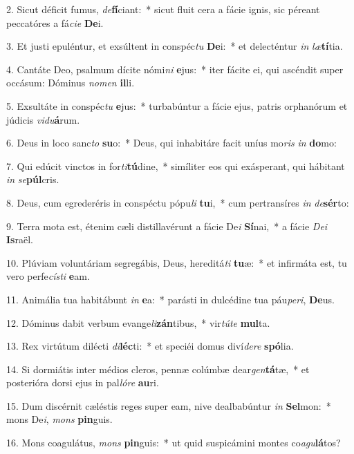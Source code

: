 2. Sicut déficit fumus, \textit{de}\textbf{fí}ciant:~*  sicut fluit cera a fácie ignis, sic péreant peccatóres a fá\textit{ci}\textit{e} \textbf{De}i.\

3. Et justi epuléntur, et exsúltent in conspéc\textit{tu} \textbf{De}i:~*  et delecténtur \textit{in} \textit{læ}\textbf{tí}tia.\

4. Cantáte Deo, psalmum dícite nómi\textit{ni} \textbf{e}jus:~*  iter fácite ei, qui ascéndit super occásum: Dóminus \textit{no}\textit{men} \textbf{il}li.\

5. Exsultáte in conspéc\textit{tu} \textbf{e}jus:~*  turbabúntur a fácie ejus, patris orphanórum et júdicis \textit{vi}\textit{du}\textbf{á}rum.\

6. Deus in loco sanc\textit{to} \textbf{su}o:~*  Deus, qui inhabitáre facit uníus mo\textit{ris} \textit{in} \textbf{do}mo:\

7. Qui edúcit vinctos in for\textit{ti}\textbf{tú}dine,~*  simíliter eos qui exásperant, qui hábitant \textit{in} \textit{se}\textbf{púl}cris.\

8. Deus, cum egrederéris in conspéctu pópu\textit{li} \textbf{tu}i,~*  cum pertransíres \textit{in} \textit{de}\textbf{sér}to:\

9. Terra mota est, étenim cæli distillavérunt a fácie De\textit{i} \textbf{Sí}nai,~*  a fácie \textit{De}\textit{i} \textbf{Is}raël.\

10. Plúviam voluntáriam segregábis, Deus, hereditá\textit{ti} \textbf{tu}æ:~*  et infirmáta est, tu vero perfe\textit{cís}\textit{ti} \textbf{e}am.\

11. Animália tua habitábunt \textit{in} \textbf{e}a:~*  parásti in dulcédine tua páu\textit{pe}\textit{ri}, \textbf{De}us.\

12. Dóminus dabit verbum evange\textit{li}\textbf{zán}tibus,~*  vir\textit{tú}\textit{te} \textbf{mul}ta.\

13. Rex virtútum dilécti \textit{di}\textbf{léc}ti:~*  et speciéi domus diví\textit{de}\textit{re} \textbf{spó}lia.\

14. Si dormiátis inter médios cleros, pennæ colúmbæ dear\textit{gen}\textbf{tá}tæ,~*  et posterióra dorsi ejus in pal\textit{ló}\textit{re} \textbf{au}ri.\

15. Dum discérnit cæléstis reges super eam, nive dealbabúntur \textit{in} \textbf{Sel}mon:~*  mons De\textit{i}, \textit{mons} \textbf{pin}guis.\

16. Mons coagulátus, \textit{mons} \textbf{pin}guis:~*  ut quid suspicámini montes co\textit{a}\textit{gu}\textbf{lá}tos?\

